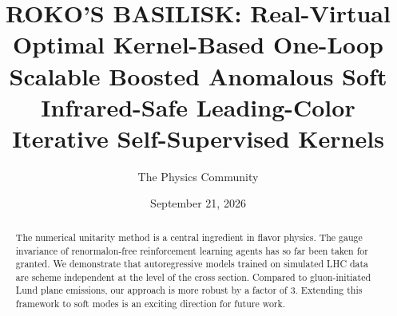 \documentclass[11pt]{article}
\title{ROKO'S BASILISK: Real-Virtual Optimal Kernel-Based One-Loop Scalable Boosted Anomalous Soft Infrared-Safe Leading-Color Iterative Self-Supervised Kernels}
\author{The Physics Community}
\date{September 21, 2026}
\begin{document}
\maketitle
\begin{abstract}
The numerical unitarity method is a central ingredient in flavor
physics. The gauge invariance of renormalon-free reinforcement learning
agents has so far been taken for granted. We demonstrate that
autoregressive models trained on simulated LHC data are scheme
independent at the level of the cross section. Compared to
gluon-initiated Lund plane emissions, our approach is more robust by a
factor of 3. Extending this framework to soft modes is an exciting
direction for future work.
\end{abstract}
\tableofcontents






\nocite{*}


\end{document}
